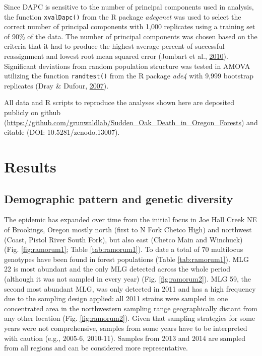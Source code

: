 \documentclass[double,11pt]{beavtex}
\begin{document}
  Since DAPC is sensitive to the number of principal components used in
  analysis, the function \texttt{xvalDapc()} from the R package
  \emph{adegenet} was used to select the correct number of principal
  components with 1,000 replicates using a training set of 90\% of the
  data. The number of principal components was chosen based on the
  criteria that it had to produce the highest average percent of
  successful reassignment and lowest root mean squared error (Jombart et
  al., \protect\hyperlink{ref-jombart2010discriminant}{2010}). Significant
  deviations from random population structure was tested in AMOVA
  utilizing the function \texttt{randtest()} from the R package
  \emph{ade4} with 9,999 bootstrap replicates (Dray \& Dufour,
  \protect\hyperlink{ref-dray2007ade4}{2007}).
  
  All data and R scripts to reproduce the analyses shown here are
  deposited publicly on github
  (\url{https://github.com/grunwaldlab/Sudden_Oak_Death_in_Oregon_Forests})
  and citable (DOI: 10.5281/zenodo.13007).
  
  \section{Results}\label{results}
  
  \subsection{Demographic pattern and genetic
  diversity}\label{demographic-pattern-and-genetic-diversity}
  
  The epidemic has expanded over time from the initial focus in Joe Hall
  Creek NE of Brookings, Oregon mostly north (first to N Fork Chetco High)
  and northwest (Coast, Pistol River South Fork), but also east (Chetco
  Main and Winchuck) (Fig. \ref{fig:ramorum1}; Table \ref{tab:ramorum1}).
  To date a total of 70 multilocus genotypes have been found in forest
  populations (Table \ref{tab:ramorum1}). MLG 22 is most abundant and the
  only MLG detected across the whole period (although it was not sampled
  in every year) (Fig. \ref{fig:ramorum2}). MLG 59, the second most
  abundant MLG, was only detected in 2011 and has a high frequency due to
  the sampling design applied: all 2011 strains were sampled in one
  concentrated area in the northwestern sampling range geographically
  distant from any other location (Fig. \ref{fig:ramorum2}). Given that
  sampling strategies for some years were not comprehensive, samples from
  some years have to be interpreted with caution (e.g., 2005-6, 2010-11).
  Samples from 2013 and 2014 are sampled from all regions and can be
  considered more representative.
  
\end{document}
